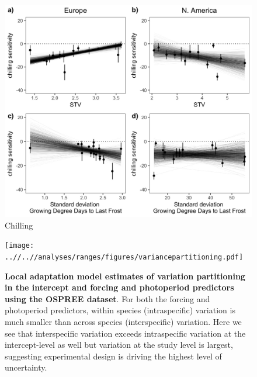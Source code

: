 \documentclass[12pt]{article}
\begin{document}
\begin{figure}[h!]
    \centering
 \includegraphics[width=\textwidth]{..//..//analyses/ranges/figures/contz_chill.jpeg} 
    \caption{Chilling}
    \label{fig:chill}
\end{figure}


\begin{figure}[h!]
    \centering
 \texttt{[image: ..//..//analyses/ranges/figures/variancepartitioning.pdf]} 
    \caption{ \textbf{Local adaptation model estimates of variation partitioning in the intercept and forcing and photoperiod predictors using the OSPREE dataset}. For both the forcing and photoperiod predictors, within species (intraspecific) variation is much smaller than across species (interspecific) variation. Here we see that interspecific variation exceeds intraspecific variation at the intercept-level as well but variation at the study level is largest, suggesting experimental design is driving the highest level of uncertainty.}
    \label{fig:popy}
\end{figure}
\end{document}
